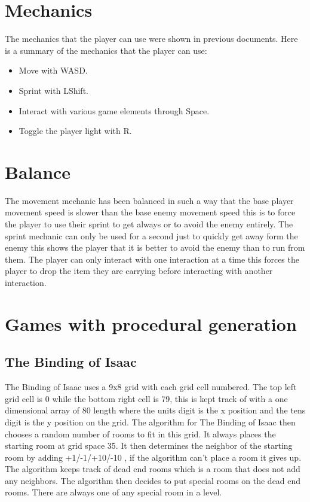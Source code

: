 \documentclass{article}
\begin{document}
\section*{Mechanics}
The mechanics that the player can use were shown in previous documents.
Here is a summary of the mechanics that the player can use:
\begin{itemize}
    \item Move with WASD.
    \item Sprint with LShift.
    \item Interact with various game elements through Space.
    \item Toggle the player light with R.
\end{itemize}
\section*{Balance}
The movement mechanic has been balanced in such a way that the base player movement speed is slower
than the base enemy movement speed this is to force the player to use their sprint to get always
or to avoid the enemy entirely. 
The sprint mechanic can only be used for a second just to quickly get away form the enemy this
shows the player that it is better to avoid the enemy than to run from them.
The player can only interact with one interaction at a time this forces the player to drop the item 
they are carrying before interacting with another interaction.


\section*{Games with procedural generation}
\subsection*{The Binding of Isaac}
The Binding of Isaac uses a 9x8 grid with each grid cell numbered. The top left grid cell is 0 while
the bottom right cell is 79, this is kept track of with a one dimensional array of 80 length where
the units digit is the x position and the tens digit is the y position on the grid. The algorithm 
for The Binding of Isaac then chooses a random number of rooms to fit in this grid. It always places
the starting room at grid space 35. It then determines the neighbor of the starting room by adding
+1/-1/+10/-10 , if the algorithm can't place a room it gives up. The algorithm keeps track of dead end
rooms which is a room that does not add any neighbors. The algorithm then decides to put special rooms
on the dead end rooms. There are always one of any special room in a level.
\end{document}
